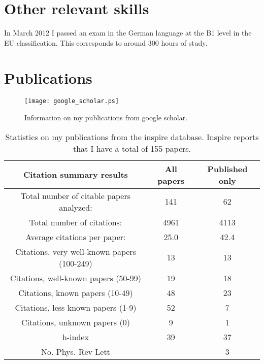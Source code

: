 \documentclass[12pt]{article}
\begin{document}
\section{Other relevant skills}

In March 2012 I passed an exam in the German language
at the B1 level in the EU classification. 
This corresponds to around 300 hours of study.




\section{Publications}

\begin{figure}
\begin{center}
\texttt{[image: google\_scholar.ps]}
\end{center}
 \caption {
Information on my publications from google scholar.
 }
\label{fig:mefffine}
 \end{figure}

\begin{table}[tb]
\centering
\begin{tabular}{|c|c|c|} \hline
Citation summary results	& All papers	& Published only
\\ \hline
Total number of citable papers analyzed: &	141 &	  62 \\
Total number of citations:  &   4961	 &	4113 \\
Average citations per paper:   & 25.0	&	42.4 \\
Citations, very well-known papers (100-249) &	13 &	13 \\
Citations, well-known papers (50-99)	&	19 &	18 \\
Citations, known papers (10-49)		&	48 &	23 \\
Citations, less known papers (1-9)	&	52 &	7 \\
Citations, unknown papers (0)		&	9  &	1  \\
h-index                                 &     39	&    37 \\
No. Phys. Rev Lett &	    	&    3 \\
\hline
\end{tabular}
\label{tb:fb1summary}
  \caption{
Statistics on my publications from the inspire database. Inspire
reports that I have a total of 155 papers.
}
\end{table}







\end{document}

